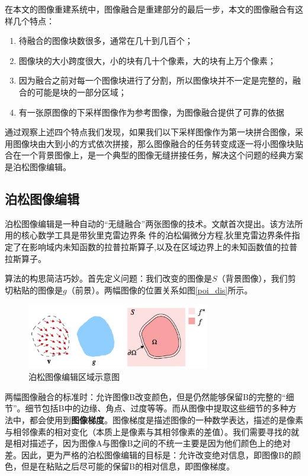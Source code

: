 在本文的图像重建系统中，图像融合是重建部分的最后一步，本文的图像融合有这样几个特点：

\begin{enumerate}
\item 待融合的图像块数很多，通常在几十到几百个；
\item 图像块的大小跨度很大，小的块有几十个像素，大的块有上万个像素；
\item 因为融合之前对每一个图像块进行了分割，所以图像块并不一定是完整的，融合的可能是块的一部分区域；
\item 有一张原图像的下采样图像作为参考图像，为图像融合提供了可靠的依据
\end{enumerate}

通过观察上述四个特点我们发现，如果我们以下采样图像作为第一块拼合图像，采用图像块由大到小的方式依次拼接，那么图像融合的任务转变成逐一将小图像块贴合在一个背景图像上，是一个典型的图像无缝拼接任务，解决这个问题的经典方案是泊松图像编辑。

\subsection{泊松图像编辑}
泊松图像编辑是一种自动的“无缝融合”两张图像的技术。文献\cite{Perez:2003ul}首次提出。该方法所用的核心数学工具是带狄里克雷边界条 件的泊松偏微分方程,狄里克雷边界条件指定了在影响域内未知函数的拉普拉斯算子,以及在区域边界上的未知函数值的拉普拉斯算子\cite{张建桥:2010vm}。

算法的构思简洁巧妙。首先定义问题：我们改变的图像是\(S\)（背景图像），我们剪切粘贴的图像是\(g\)（前景）。两幅图像的位置关系如图\ref{poi_dis}所示。

\begin{figure}
\centering\includegraphics[width=8.00cm]{imgs/ch2/poi_dis}
\caption{泊松图像编辑区域示意图}
\label{fig:poi_dis}
\end{figure}

两幅图像融合的标准时：允许图像B改变颜色，但是仍然能够保留B的完整的“细节”。细节包括B中的边缘、角点、过度等等。而从图像中提取这些细节的多种方法中，都会使用到\textbf{图像梯度}。图像梯度是描述图像的一种数学表达，描述的是像素与相邻像素的相对变化（本质上是像素与其相邻像素的差值）。我们需要寻找的就是相对描述子，因为图像A与图像B之间的不统一主要是因为他们颜色上的绝对差。因此，更为严格的泊松图像编辑的目标是：允许改变绝对信息，即图像B的颜色，但是在粘贴之后尽可能的保留B的相对信息，即图像梯度。

